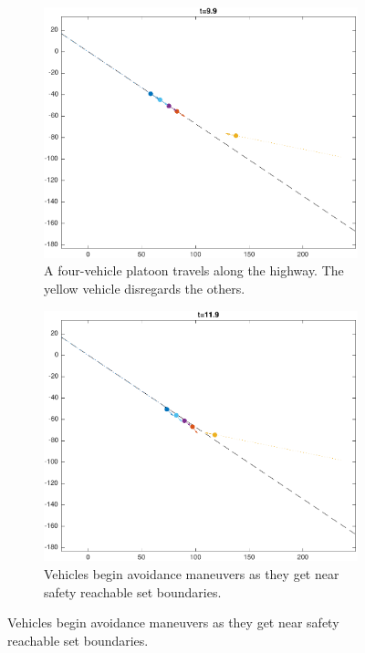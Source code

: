 \begin{figure}
    \centering
    \begin{subfigure}[t]{0.45\textwidth} \label{subfig:in_100}
        \includegraphics[width=\textwidth]{fig/in_100}
        \caption{A four-vehicle platoon travels along the highway. The yellow vehicle disregards the others.}
    \end{subfigure}
    \begin{subfigure}[t]{0.45\textwidth} \label{subfig:in_120}
        \includegraphics[width=\textwidth]{fig/in_120}
        \caption{Vehicles begin avoidance maneuvers as they get near safety reachable set boundaries.}
    \end{subfigure}


\end{figure}
